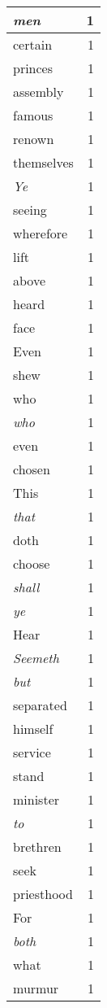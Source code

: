 \begin{center}
\begin{longtable}{l|r}
\emph{men} & 1 \\ \hline
certain & 1 \\ \hline
princes & 1 \\ \hline
assembly & 1 \\ \hline
famous & 1 \\ \hline
renown & 1 \\ \hline
themselves & 1 \\ \hline
\emph{Ye} & 1 \\ \hline
seeing & 1 \\ \hline
wherefore & 1 \\ \hline
lift & 1 \\ \hline
above & 1 \\ \hline
heard & 1 \\ \hline
face & 1 \\ \hline
Even & 1 \\ \hline
shew & 1 \\ \hline
who & 1 \\ \hline
\emph{who} & 1 \\ \hline
even & 1 \\ \hline
chosen & 1 \\ \hline
This & 1 \\ \hline
\emph{that} & 1 \\ \hline
doth & 1 \\ \hline
choose & 1 \\ \hline
\emph{shall} & 1 \\ \hline
\emph{ye} & 1 \\ \hline
Hear & 1 \\ \hline
\emph{Seemeth} & 1 \\ \hline
\emph{but} & 1 \\ \hline
separated & 1 \\ \hline
himself & 1 \\ \hline
service & 1 \\ \hline
stand & 1 \\ \hline
minister & 1 \\ \hline
\emph{to} & 1 \\ \hline
brethren & 1 \\ \hline
seek & 1 \\ \hline
priesthood & 1 \\ \hline
For & 1 \\ \hline
\emph{both} & 1 \\ \hline
what & 1 \\ \hline
murmur & 1 \\ \hline

\end{longtable}
\end{center}
